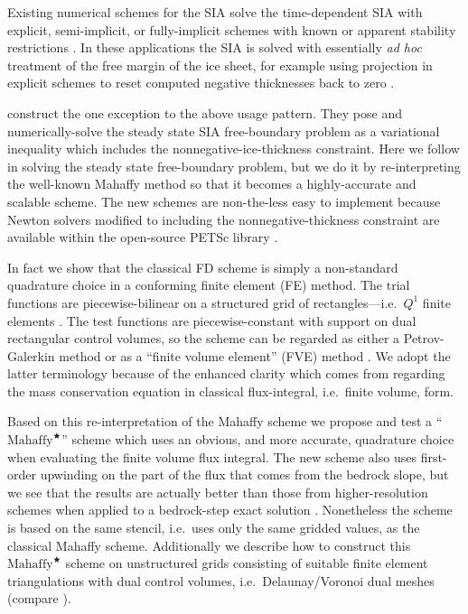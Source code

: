 \documentclass[twocolumn]{igs}
\newcommand{\Mstar}{$\text{Mahaffy}^{\bigstar}$\xspace}
\begin{document}
Existing numerical schemes for the SIA solve the time-dependent SIA with explicit, semi-implicit, or fully-implicit schemes with known or apparent stability restrictions \citep[among others]{Bueleretal2005,EgholmNielsen2010,HindmarshPayne1996,Huybrechtsetal1996,
JaroschSchoofAnslow2013}.  In these applications the SIA is solved with essentially \emph{ad hoc} treatment of the free margin of the ice sheet, for example using projection in explicit schemes to reset computed negative thicknesses back to zero \citep{Bueleretal2005,JaroschSchoofAnslow2013}.

\cite{JouvetBueler2012} construct the one exception to the above usage pattern.  They pose and numerically-solve the steady state SIA free-boundary problem as a variational inequality \citep{KinderlehrerStampacchia} which includes the nonnegative-ice-thickness constraint.  Here we follow \cite{JouvetBueler2012} in solving the steady state free-boundary problem, but we do it by re-interpreting the well-known Mahaffy method so that it becomes a highly-accurate and scalable scheme.  The new schemes are non-the-less easy to implement because Newton solvers modified to including the nonnegative-thickness constraint \citep{BensonMunson2006} are available within the open-source PETSc library \citep{Balayetal2014}.

In fact we show that the classical \cite{Mahaffy1976} FD scheme is simply a non-standard quadrature choice in a conforming finite element (FE) method.  The trial functions are piecewise-bilinear on a structured grid of rectangles---i.e.~$Q^1$ finite elements \citep{Elmanetal2005}.  The test functions are piecewise-constant with support on dual rectangular control volumes, so the scheme can be regarded as either a Petrov-Galerkin method \citep{Elmanetal2005} or as a ``finite volume element'' (FVE) method \citep{Cai1990,EwingLinLin2002}.  We adopt the latter terminology because of the enhanced clarity which comes from regarding the mass conservation equation in classical flux-integral, i.e.~finite volume, form.

Based on this re-interpretation of the Mahaffy scheme we propose and test a ``\Mstar'' scheme which uses an obvious, and more accurate, quadrature choice when evaluating the finite volume flux integral.  The new scheme also uses first-order upwinding on the part of the flux that comes from the bedrock slope, but we see that the results are actually better than those from higher-resolution schemes when applied to a bedrock-step exact solution \citep{JaroschSchoofAnslow2013}.  Nonetheless the scheme is based on the same stencil, i.e.~uses only the same gridded values, as the classical Mahaffy scheme.  Additionally we describe how to construct this \Mstar scheme on unstructured grids consisting of suitable finite element triangulations with dual control volumes, i.e.~Delaunay/Voronoi dual meshes (compare \cite{Ringleretal2013}).
\end{document}
